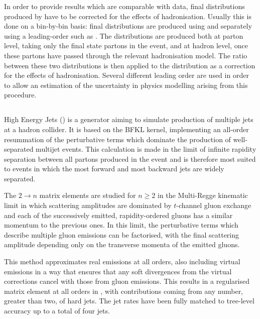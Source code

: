 In order to provide results which are comparable with data, final distributions produced by \NLOjetpp have to be corrected for the effects of hadronisation.
Usually this is done on a bin-by-bin basis: final distributions are produced using \NLOjetpp and separately using a leading-order \MC such as \Pythia.
The \Pythia distributions are produced both at parton level, taking only the final state partons in the event, and at hadron level, once these partons have passed through the relevant hadronisation model.
The ratio between these two distributions is then applied to the \NLOjetpp distribution as a correction for the effects of hadronisation.
Several different leading order  are used in order to allow an estimation of the uncertainty in physics modelling arising from this procedure.

\subsection{\HEJ}
\label{sec:bg-theory:MC:HEJ}
High Energy Jets (\HEJ) is a \MC generator aiming to simulate production of multiple jets at a hadron collider.
It is based on the BFKL kernel, implementing an all-order resummation of the perturbative terms which dominate the production of well-separated multijet events.
This calculation is made in the limit of infinite rapidity separation between all partons produced in the event and is therefore most suited to events in which the most forward and most backward jets are widely separated.

The $2 \rightarrow n$ matrix elements are studied for $n \ge 2$ in the Multi-Regge kinematic limit in which scattering amplitudes are dominated by $t$-channel gluon exchange~\cite{Andersen:2009:Factorisation} and each of the successively emitted, rapidity-ordered gluons has a similar momentum to the previous ones.
In this limit, the perturbative terms which describe multiple gluon emissions can be factorised, with the final scattering amplitude depending only on the transverse momenta of the emitted gluons.

This method approximates real emissions at all orders, also including virtual emissions in a way that ensures that any soft divergences from the virtual corrections cancel with those from gluon emissions.
This results in a regularised matrix element at all orders in \alphaS, with contributions coming from any number, greater than two, of hard jets. The jet rates have been fully matched to tree-level accuracy up to a total of four jets.

